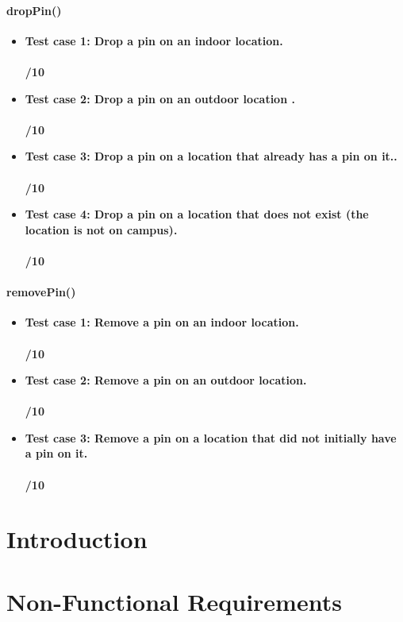 \documentclass[runningheads,a4paper]{article}
\begin{document}
	\paragraph{dropPin()}
	\begin{itemize}
		\item \textbf{Test case 1: Drop a pin on an indoor location.} \\
		\\ \textbf{/10}
		\item \textbf{Test case 2: Drop a pin on an outdoor location .} \\
		\\ \textbf{/10}
		\item \textbf{Test case 3: Drop a pin on a location that already has a pin on it..} \\
		\\ \textbf{/10}
		\item \textbf{Test case 4: Drop a pin on a location that does not exist (the location is not on campus).} \\
		\\ \textbf{/10}
		
	\end{itemize}
	
	\paragraph{removePin()}
	\begin{itemize}
		\item \textbf{Test case 1: Remove a pin on an indoor location.} \\
		\\ \textbf{/10}
		\item \textbf{Test case 2: Remove a pin on an outdoor location.} \\
		\\ \textbf{/10}
		\item \textbf{Test case 3: Remove a pin on a location that did not initially have a pin on it.} \\
		\\ \textbf{/10}
	
	\end{itemize}
	
\newpage

\section{Introduction}

	\section{Non-Functional Requirements}
	
\end{document}
